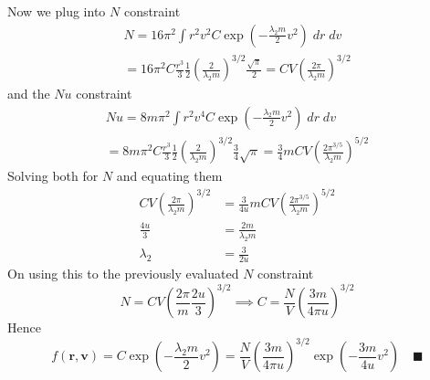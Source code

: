 \documentclass[../../../Main.tex]{subfiles}
\begin{document}
Now we plug into $N$ constraint
\begin{multline*}
    N=16\pi^2\int r^2v^2 C\exp\left(- \frac{\lambda_2m}{2}v^2\right)\;dr\;dv\\
    = 16\pi^2C\frac{r^3}{3}\frac{1}{2}\left(\frac{2}{\lambda_2m}\right)^{3/2}\frac{\sqrt{\pi}}{2}
    =CV\left(\frac{2\pi}{\lambda_2m}\right)^{3/2}
\end{multline*}
and the $Nu$ constraint
\begin{multline*}
    Nu=8m\pi^2\int r^2v^4 C\exp\left(- \frac{\lambda_2m}{2}v^2\right)\;dr\;dv\\
    = 8m\pi^2C \frac{r^3}{3}\frac{1}{2}\left(\frac{2}{\lambda_2m}\right)^{3/2}\frac{3}{4}\sqrt{\pi}
    = \frac{3}{4}mCV\left(\frac{2\pi^{3/5}}{\lambda_2m}\right)^{5/2}
\end{multline*}
Solving both for $N$ and equating them 
\begin{align*}
    CV\left(\frac{2\pi}{\lambda_2m}\right)^{3/2}&=\frac{3}{4u}mCV\left(\frac{2\pi^{3/5}}{\lambda_2m}\right)^{5/2}\\
    \frac{4u}{3}&=\frac{2m}{\lambda_2m}\\
    \lambda_2&=\frac{3}{2u}
\end{align*}
On using this to the previously evaluated $N$ constraint
\begin{equation*}
    N=CV\left(\frac{2\pi}{m}\frac{2u}{3}\right)^{3/2}\implies C=\frac{N}{V}\left(\frac{3m}{4\pi u}\right)^{3/2}
\end{equation*}
Hence
\begin{equation*}
    f(\mathbf{r},\mathbf{v})=C\exp\left(- \frac{\lambda_2m}{2}v^2\right)= \frac{N}{V} \left(\frac{3m}{4\pi u}\right)^{3/2}\exp\left(-\frac{3m}{4u}v^2\right)\quad \blacksquare
\end{equation*}
\end{document}
